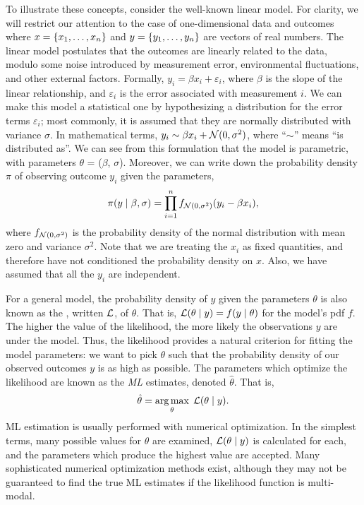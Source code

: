 To illustrate these concepts, consider the well-known linear model. For
clarity, we will restrict our attention to the case of one-dimensional data and
outcomes where $x = \left\lbrace x_1, \ldots, x_n\right\rbrace$ and $y = \left\lbrace y_1, \ldots, y_n\right\rbrace$
are vectors of real numbers. The linear model postulates that the outcomes are
linearly related to the data, modulo some noise introduced by measurement
error, environmental fluctuations, and other external factors. Formally, $y_i =
\beta x_i + \varepsilon_i$, where $\beta$ is the slope of the linear
relationship, and $\varepsilon_i$ is the error associated with measurement $i$.
We can make this model a statistical one by hypothesizing a distribution for
the error terms $\varepsilon_i$; most commonly, it is assumed that they are
normally distributed with variance $\sigma$. In mathematical terms, $y_i \sim
\beta x_i + \mathcal{N}(0, \sigma^2)$, where ``$\sim$'' means ``is distributed as''. We
can see from this formulation that the model is parametric, with parameters
$\theta$ = ($\beta$, $\sigma$). Moreover, we can write down the probability
density $\pi$ of observing outcome $y_i$ given the parameters,
\[
  \pi(y \mid \beta, \sigma) = 
  \prod_{i=1}^n f_{\mathcal{N}(0, \sigma^2)} (y_i - \beta x_i),
\]
where $f_{\mathcal{N}(0, \sigma^2)}$ is the probability density of the normal
distribution with mean zero and variance $\sigma^2$. Note that we are treating
the $x_i$ as fixed quantities, and therefore have not conditioned the
probability density on $x$. Also, we have assumed that all the $y_i$ are
independent.

For a general model, the probability density of $y$ given the parameters
$\theta$ is also known as the , written $\mathcal{L}$, of $\theta$.
That is, $\mathcal{L}(\theta \mid y) = f(y \mid \theta)$ for the model's \gls{pdf} $f$.
The higher the value of the likelihood, the more likely the observations $y$
are under the model. Thus, the likelihood provides a natural criterion for
fitting the model parameters: we want to pick $\theta$ such that the
probability density of our observed outcomes $y$ is as high as possible. The
parameters which optimize the likelihood are known as the \textit{\gls{ML}}
estimates, denoted $\hat{\theta}$. That is,
\[
  \hat{\theta} = \operatorname*{arg\,max}_\theta\; \mathcal{L}(\theta \mid y).
\]
\Gls{ML} estimation is usually performed with numerical optimization. In the
simplest terms, many possible values for $\theta$ are examined, $\mathcal{L}(\theta \mid
y)$ is calculated for each, and the parameters which produce the highest value
are accepted. Many sophisticated numerical optimization methods exist, although
they may not be guaranteed to find the true \gls{ML} estimates if the
likelihood function is multi-modal. 

